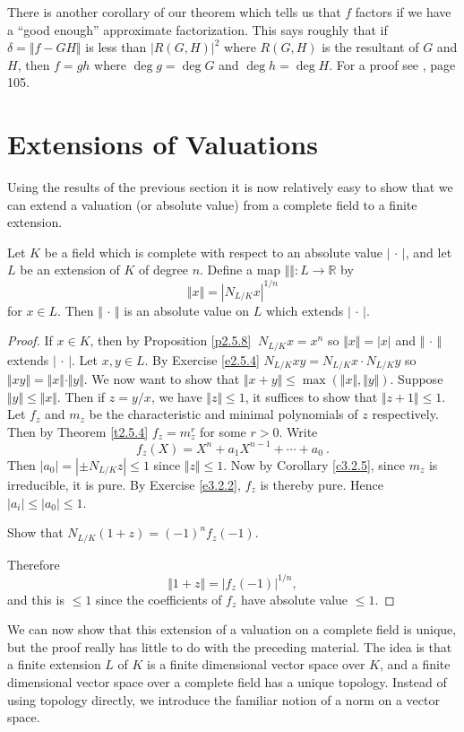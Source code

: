 \rem
There is another corollary of our theorem which tells us that $f$ factors if we have a ``good enough'' approximate factorization. This says roughly that if $\delta=\Vert f-GH\Vert$ is less than $|R(G,H)|^{2}$ where $R(G,H)$ is the resultant of $G$ and $H$, then $f=gh$ where $\deg g=\deg G$ and $\deg h=\deg H$. For a proof see \cite{r2.4}, page 105.

\section{Extensions of Valuations}

Using the results of the previous section it is now relatively easy to show that we can extend a valuation (or absolute value) from a complete field to a finite extension.

\begin{theo}
\label{t3.3.4}Let $K$ be a field which is complete with respect to an absolute value $|\, \cdot\, |$, and let $L$ be an extension of $K$ of degree $n$. Define a map $\Vert\Vert:L\rightarrow \mathbb{R}$ by
$$
\Vert x\Vert=|N_{L/K}x|^{1/n}
$$
for $x\in L$. Then $\Vert\, \cdot\, \Vert$ is an absolute value on $L$ which extends $|\, \cdot\, |$.
\end{theo}

\begin{proof} If $x\in K$, then by Proposition \ref{p2.5.8} $\ N_{L/K}x=x^{n}$ so $\Vert x\Vert=|x|$ and $\Vert\, \cdot\, \Vert$ extends $|\, \cdot\, |$. Let $x, y\in L$. By Exercise \ref{e2.5.4} $N_{L/K}xy=N_{L/K}x\cdot N_{L/K}y$ so $\Vert xy\Vert=\Vert x\Vert\cdot\Vert y\Vert$. We now want to show that $\displaystyle \Vert x+y\Vert\leq\max(\Vert x\Vert,\Vert y\Vert)$. Suppose $\Vert y\Vert\leq\Vert x\Vert$. Then if $z=y/x$, we have $\Vert z\Vert\leq 1$, it suffices to show that $\Vert z+1\Vert\leq 1$. Let $f_{z}$ and $m_{z}$ be the characteristic and minimal polynomials of $z$ respectively. Then by Theorem \ref{t2.5.4} $f_{z}=m_{z}^{r}$ for some $r>0$. Write
$$
f_{z}(X)=X^{n}+a_{1}X^{n-1}+\cdots+a_{0}\ .
$$
Then $|a_{0}|=|\pm N_{L/K}z|\leq 1$ since $\Vert z\Vert\leq 1$. Now by Corollary \ref{c3.2.5}, since $m_{z}$ is irreducible, it is pure. By Exercise \ref{e3.2.2}, $f_{z}$ is thereby pure. Hence $|a_{i}|\leq|a_{0}|\leq 1$.

\begin{exo}
\label{e3.3.3}
Show that $N_{L/K}(1+z)=(-1)^{n}f_{z}(-1)$.
\end{exo}

Therefore
$$
\Vert 1+z\Vert=|f_{z}(-1)|^{1/n},
$$
and this is $\leq 1$ since the coefficients of $f_{z}$ have absolute value $\leq 1$.
\end{proof}
We can now show that this extension of a valuation on a complete field is unique, but the proof really has little to do with the preceding material. The idea is that a finite extension $L$ of $K$ is a finite dimensional vector space over $K$, and a finite dimensional vector space over a complete field has a unique topology. Instead of using topology directly, we introduce the familiar notion of a norm on a vector space.

